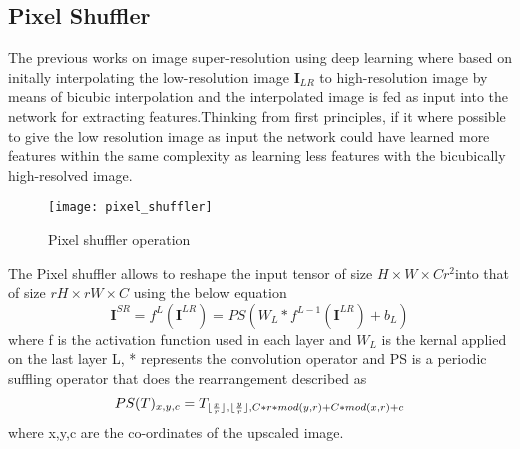 \subsection{Pixel Shuffler}
The previous works on image super-resolution using deep learning  where based on initally interpolating the low-resolution image $\textbf{I}_{LR}$ to high-resolution image by means of bicubic interpolation and the interpolated image is fed as input into the network for extracting features.Thinking from first principles, if it where possible to give the low resolution image as input the network could have learned more features within the same complexity as learning less features with the bicubically high-resolved image.
\begin{figure}[h!]
 \centering
 \texttt{[image: pixel\_shuffler]}
 \caption{Pixel shuffler operation}
 \label{fig:pixelshuffler}
\end{figure}

The Pixel shuffler allows to reshape the input tensor of size $ H \times W \times Cr^2 $into that of size $rH \times rW \times C$ using the below equation
\begin{equation}
\textbf{I}^{SR} = f^L(\textbf{I}^{LR}) = PS(W_L * f^{L-1}(\textbf{I}^{LR}) + b_L)
\end{equation}
where f is the activation function used in each layer and $W_L$ is the kernal applied on the last layer L, * represents the convolution operator and  PS is a periodic suffling operator that does the rearrangement described as
\begin{equation}
PS(T)_{x,y,c} = T_{\lfloor\frac{x}{r}\rfloor,\lfloor\frac{y}{r}\rfloor,C*r*mod(y,r) + C*mod(x,r)+c}
\end{equation}
where x,y,c are the co-ordinates of the upscaled image.